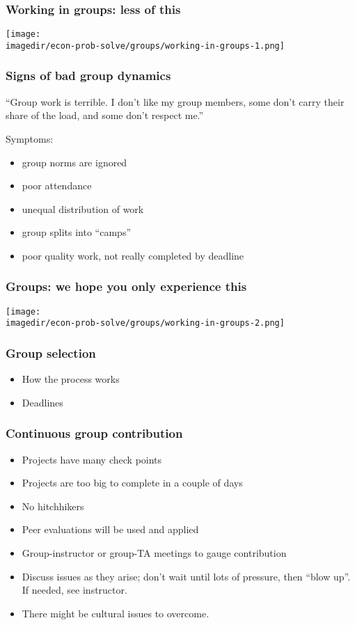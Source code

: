 \begin{frame}\frametitle{Working in groups: less of this}
	\begin{center}
		\texttt{[image: \\imagedir/econ-prob-solve/groups/working-in-groups-1.png]}
	\end{center}
\end{frame}

\begin{frame}\frametitle{Signs of bad group dynamics}
	\begin{exampleblock}{}
		``Group work is terrible. I don't like my group members, some don't carry their share of the load, and some don't respect me.''
	\end{exampleblock}
	Symptoms:
	\begin{itemize}
		\item	group norms are ignored
		\item	poor attendance
		\item	unequal distribution of work
		\item	group splits into ``camps''
		\item	poor quality work, not really completed by deadline
	\end{itemize}
\end{frame}

\begin{frame}\frametitle{Groups: we hope you only experience this}
	\begin{center}
		\texttt{[image: \\imagedir/econ-prob-solve/groups/working-in-groups-2.png]}
	\end{center}
\end{frame}


\begin{frame}\frametitle{Group selection}
	\begin{itemize}
		\item	How the process works
		\item	Deadlines
	\end{itemize}
\end{frame}

\begin{frame}\frametitle{Continuous group contribution}
	\begin{itemize}
		\item	Projects have many check points
		\item	Projects are too big to complete in a couple of days
		\item	No hitchhikers
		\item	Peer evaluations will be used and applied
		\item	Group-instructor or group-TA meetings to gauge contribution
		\item	Discuss issues as they arise; don't wait until lots of pressure, then ``blow up''.  If needed, see instructor.
		\item	There might be cultural issues to overcome.
	\end{itemize}
\end{frame}



